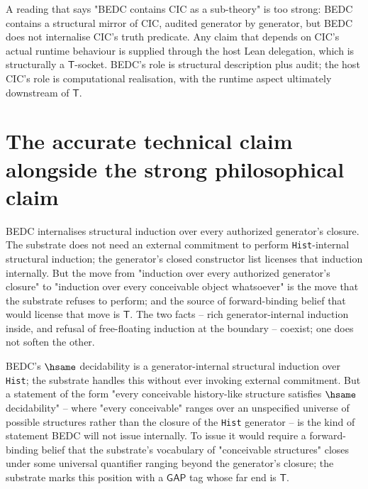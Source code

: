 \begin{remark}
\label{rem:certificate-closure-bedc-swallow-cic-too-strong}
A reading that says "BEDC contains CIC as a sub-theory" is too strong: BEDC contains a structural mirror of CIC, audited generator by generator, but BEDC does not internalise CIC's truth predicate. Any claim that depends on CIC's actual runtime behaviour is supplied through the host Lean delegation, which is structurally a $\mathsf{T}$-socket. BEDC's role is structural description plus audit; the host CIC's role is computational realisation, with the runtime aspect ultimately downstream of $\mathsf{T}$.
\end{remark}

\section{The accurate technical claim alongside the strong philosophical claim}
\label{sec:certificate-closure-accurate-with-strong}

\begin{principle}
\label{prin:certificate-closure-generator-internal-does-not-weaken}
BEDC internalises structural induction over every authorized generator's closure. The substrate does not need an external commitment to perform \texttt{Hist}-internal structural induction; the generator's closed constructor list licenses that induction internally. But the move from "induction over every authorized generator's closure" to "induction over every conceivable object whatsoever" is the move that the substrate refuses to perform; and the source of forward-binding belief that would license that move is $\mathsf{T}$. The two facts -- rich generator-internal induction inside, and refusal of free-floating induction at the boundary -- coexist; one does not soften the other.
\end{principle}

\begin{example}
\label{ex:certificate-closure-hist-inside-free-floating-outside}
BEDC's $\hsame$ decidability is a generator-internal structural induction over \texttt{Hist}; the substrate handles this without ever invoking external commitment. But a statement of the form "every conceivable history-like structure satisfies $\hsame$ decidability" -- where "every conceivable" ranges over an unspecified universe of possible structures rather than the closure of the \texttt{Hist} generator -- is the kind of statement BEDC will not issue internally. To issue it would require a forward-binding belief that the substrate's vocabulary of "conceivable structures" closes under some universal quantifier ranging beyond the generator's closure; the substrate marks this position with a $\mathsf{GAP}$ tag whose far end is $\mathsf{T}$.
\end{example}

